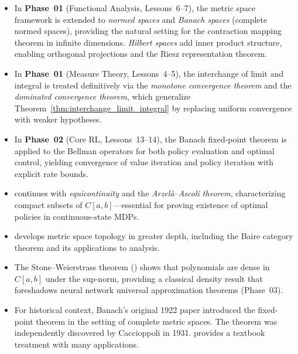 \documentclass[11pt,a4paper]{article}
\begin{document}
\begin{itemize}
  \item In \textbf{Phase~01} (Functional Analysis, Lessons~6--7), the
    metric space framework is extended to \emph{normed spaces} and
    \emph{Banach spaces} (complete normed spaces), providing the
    natural setting for the contraction mapping theorem in infinite
    dimensions. \emph{Hilbert spaces} add inner product structure,
    enabling orthogonal projections and the Riesz representation
    theorem.

  \item In \textbf{Phase~01} (Measure Theory, Lessons~4--5), the
    interchange of limit and integral is treated definitively via the
    \emph{monotone convergence theorem} and the \emph{dominated
    convergence theorem}, which generalize
    Theorem~\ref{thm:interchange_limit_integral} by replacing uniform
    convergence with weaker hypotheses.

  \item In \textbf{Phase~02} (Core RL, Lessons~13--14), the Banach
    fixed-point theorem is applied to the Bellman operators for both
    policy evaluation and optimal control, yielding convergence of
    value iteration and policy iteration with explicit rate bounds.

  \item \citet[Chapter 7]{rudin1976} continues with
    \emph{equicontinuity} and the \emph{Arzel\`{a}--Ascoli theorem},
    characterizing compact subsets of $C[a,b]$---essential for proving
    existence of optimal policies in continuous-state MDPs.

  \item \citet[Chapters 2--3]{pugh2015} develops metric space topology
    in greater depth, including the Baire category theorem and its
    applications to analysis.

  \item The Stone--Weierstrass theorem (\citet[Theorem 7.26]{rudin1976})
    shows that polynomials are dense in $C[a,b]$ under the sup-norm,
    providing a classical density result that foreshadows neural network
    universal approximation theorems (Phase~03).

  \item For historical context, Banach's original 1922 paper introduced
    the fixed-point theorem in the setting of complete metric spaces.
    The theorem was independently discovered by Caccioppoli in 1931.
    \citet[Chapter 9]{bartle2011} provides a textbook treatment with
    many applications.
\end{itemize}


\end{document}
